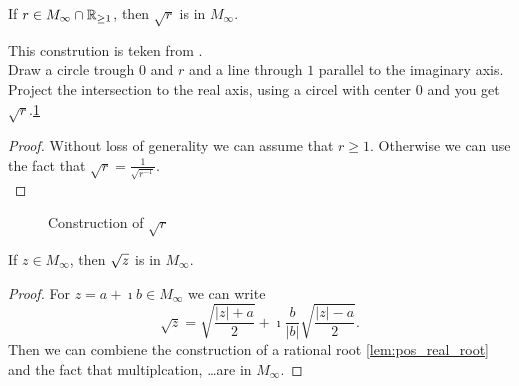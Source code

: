 \begin{lemma}
    \label{lem:pos_real_root}
    If $r \in M_{\infty}\cap\mathbb{R}_{\ge 1}$, then $\sqrt{r}$ is in  $M_{\infty}$.
\end{lemma}

This constrution is teken from \cite{JAN_SCHRÖER:2023}.\\
Draw a circle trough $0$ and $r$ and a line through $1$ parallel to the imaginary axis. Project the intersection to the real axis, using a circel with center $0$ and you get $\sqrt{r}$.\ref{Fig.root}
\begin{proof}
Without loss of generality we can assume that $r \ge 1$. Otherwise we can use the fact that $\sqrt{r} = \frac{1}{\sqrt{r^{-1}}}$.\\

\end{proof}
\begin{figure}[h]
    \centering
    \caption{Construction of $\sqrt{r}$}
    \label{Fig.root}
\end{figure}

\begin{corollary}
    \label{cor:root_M_inf}
    If $z \in M_{\infty}$, then $\sqrtsign{z}$ is in  $M_{\infty}$.
\end{corollary}
\begin{proof}
    For $z = a +\imath b \in M_{\infty}$ we can write 
    $$ \sqrt{z} = \sqrt{\frac{|z|+a}{2}}+\imath \frac{b}{|b|}\sqrt{\frac{|z|-a}{2}}.$$
    Then we can combiene the construction of a rational root \ref{lem:pos_real_root} and the fact that multiplcation, \dots are in $M_\infty$.
\end{proof}

